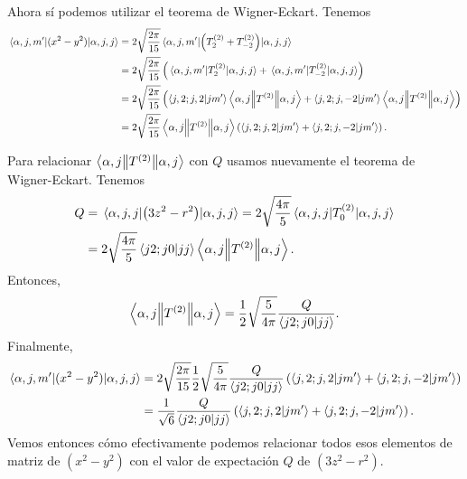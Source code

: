 \documentclass[10pt, a4paper]{article}
\numberwithin{equation}{subsection}
\begin{document}
Ahora sí podemos utilizar el teorema de Wigner-Eckart. Tenemos
\begin{align}
  \matrixel{\alpha,j,m'}{(x^2 - y^2)}{\alpha,j,j}
  &= 2\sqrt{\frac{2\pi}{15}}\matrixel{\alpha,j,m'}{\left(T^{(2)}_{2} +
    T^{(2)}_{-2}\right)}{\alpha,j,j} \nonumber \\
  &= 2\sqrt{\frac{2\pi}{15}}\left(
    \matrixel{\alpha,j,m'}{T^{(2)}_{2}}{\alpha,j,j} +
    \matrixel{\alpha,j,m'}{T^{(2)}_{-2}}{\alpha,j,j}\right) \nonumber \\
  &= 2\sqrt{\frac{2\pi}{15}}\left(
    \braket{j,2;j,2}{jm'} \doublebarmel{\alpha,j}{T^{(2)}}{\alpha,j} +
    \braket{j,2;j,-2}{jm'}
    \doublebarmel{\alpha,j}{T^{(2)}}{\alpha,j}\right) \nonumber \\
  &= 2\sqrt{\frac{2\pi}{15}} \doublebarmel{\alpha,j}{T^{(2)}}{\alpha,j} \left(
    \braket{j,2;j,2}{jm'} + \braket{j,2;j,-2}{jm'} \right).
\end{align}

Para relacionar $\left\langle{\alpha,j}\middle\|{T^{(2)}}\middle\|{\alpha,j}\right\rangle$ con $Q$ usamos
nuevamente el teorema de Wigner-Eckart. Tenemos
\begin{align}
  Q &= \expval{\left(3z^2 - r^2\right)}{\alpha,j,j}
    = 2\sqrt{\frac{4\pi}{5}}\expval{T^{(2)}_{0}}{\alpha,j,j} \nonumber \\
    &= 2\sqrt{\frac{4\pi}{5}} \braket{j2;j0}{jj}
      \left\langle{\alpha,j}\middle\|{T^{(2)}}\middle\|{\alpha,j}\right\rangle.
\end{align}
Entonces,
\begin{equation}
  \left\langle{\alpha,j}\middle\|{T^{(2)}}\middle\|{\alpha,j}\right\rangle =
  \frac{1}{2}\sqrt{\frac{5}{4\pi}} \frac{Q}{\braket{j2;j0}{jj}}.
\end{equation}
Finalmente,
\begin{align}
  \matrixel{\alpha,j,m'}{(x^2 - y^2)}{\alpha,j,j}
    &= 2\sqrt{\frac{2\pi}{15}} 
    \frac{1}{2}\sqrt{\frac{5}{4\pi}} \frac{Q}{\braket{j2;j0}{jj}}
    \left( \braket{j,2;j,2}{jm'} + \braket{j,2;j,-2}{jm'} \right) \nonumber \\
  &= \frac{1}{\sqrt{6}} \frac{Q}{\braket{j2;j0}{jj}}
    \left( \braket{j,2;j,2}{jm'} + \braket{j,2;j,-2}{jm'} \right).
\end{align}
Vemos entonces cómo efectivamente podemos relacionar todos esos elementos de
matriz de $(x^2 - y^2)$ con el valor de expectación $Q$ de $(3z^2 - r^2)$.


\end{document}
